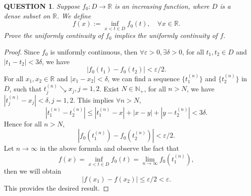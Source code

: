 \documentclass[12pt]{article}
\renewcommand{\(}{\left(}%
\renewcommand{\)}{\right)}%
\renewcommand{\[}{\left[}%
\renewcommand{\]}{\right]}%
\renewcommand{\r}{\mathbb{R}}
\newcommand{\n}{\mathbb{N}}
\newtheorem{question}{QUESTION}[section]}
\newtheorem{proof}{Proof.}}
\begin{document}
  \begin{question}
   Suppose $f_0:D\to \r$ is an increasing function, where $D$ is a dense subset on $\r$. We define
   \begin{equation*}
    f(x):=\inf_{x<t\in D}f_0(t),\quad \forall x\in \r.
   \end{equation*}
   Prove the uniformly continuity of $f_0$ implies the uniformly continuity of $f$.
  \end{question}
  \begin{proof}
   Since $f_0$ is uniformly continuous, then $\forall\varepsilon>0,\exists\delta>0$, for all $t_1,t_2\in D$ and $|t_1-t_2|<3\delta$, we have
   \begin{equation*}
    |f_0(t_1)-f_0(t_2)|<\varepsilon/2.
   \end{equation*}
    For all $x_1,x_2\in \r$ and $|x_1-x_2|<\delta$, we can find a sequence $\{t_1^{(n)} \}$ and $\{t_2^{(n)}\}$ in $D$, such that $t_j^{(n)}\searrow x_j,j=1,2$. Exist $N\in\n_+$, for all $n>N$, we have $|t_j^{(n)}-x_j|<\delta,j=1,2$. This implies $\forall n>N$,
    \begin{equation*}
     |t_1^{(n)}-t_2^{(n)}|\leq |t_1^{(n)}-x|+|x-y|+|y-t_2^{(n)}|<3\delta.
    \end{equation*}
    Hence for all $n>N$,
    \begin{equation*}
     |f_0(t_1^{(n)})-f_0(t_2^{(n)})|<\varepsilon/2.
    \end{equation*}
    Let $n\to\infty$ in the above formula and observe the fact that
    \begin{equation*}
     f(x)=\inf_{x<t\in D}f_0(t)=\lim_{n\to\infty}f_0(t_1^{(n)}),
    \end{equation*}
    then we will obtain
    \begin{equation*}
     |f(x_1)-f(x_2)|\leq  \varepsilon/2<\varepsilon .
    \end{equation*}
    This provides the desired result.
  \end{proof}
\end{document}
